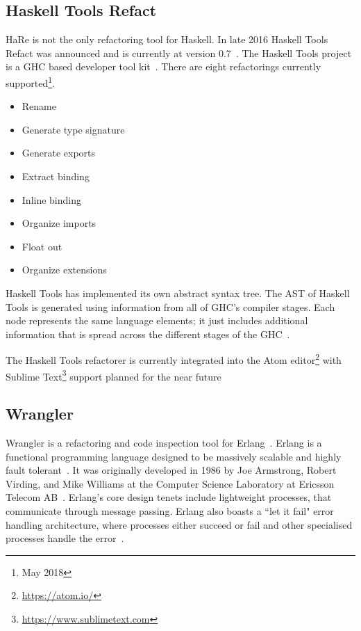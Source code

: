 \subsection{Haskell Tools Refact}

HaRe is not the only refactoring tool for Haskell. In late 2016 Haskell Tools Refact was announced and is currently at version 0.7~\citep{haskellTools}. The Haskell Tools project is a GHC based developer tool kit~\citep{haskellToolsGit}. There are eight refactorings currently supported\footnote{May 2018}.

\begin{itemize}
\item Rename
\item Generate type signature
\item Generate exports
\item Extract binding
\item Inline binding
\item Organize imports
\item Float out
\item Organize extensions
\end{itemize}

Haskell Tools has implemented  its own abstract syntax tree. The AST of Haskell Tools is generated using information from all of GHC's compiler stages. Each node represents the same language elements; it just includes additional information that is spread across the different stages of the GHC~\citep{haskellTools}.

The Haskell Tools refactorer is currently integrated into the Atom editor\footnote{\url{https://atom.io/}} with Sublime Text\footnote{\url{https://www.sublimetext.com}} support planned for the near future~\citep{haskellTools}

\subsection{Wrangler}\label{wranglerOne}
Wrangler is a refactoring and code inspection tool for Erlang~\citep{wrangler}. Erlang is a functional programming language designed to be massively scalable and highly fault tolerant~\citep{erlang}. It was originally developed in 1986 by Joe Armstrong, Robert Virding, and Mike Williams at the Computer Science Laboratory at Ericsson Telecom AB~\citep{erlangHistory}. Erlang's core design tenets include lightweight processes, that communicate through message passing. Erlang also boasts a ``let it fail" error handling architecture, where processes either succeed or fail and other specialised processes handle the error~\citep{armstrongThesis}.


